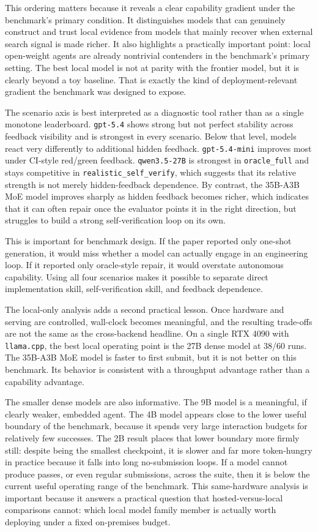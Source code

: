 \documentclass[a4paper,fleqn]{cas-dc}
\DeclareRobustCommand{\tool}[1]{\texttt{\nolinkurl{#1}}}
\begin{document}
This ordering matters because it reveals a clear capability gradient under the benchmark's primary condition. It distinguishes models that can genuinely construct and trust local evidence from models that mainly recover when external search signal is made richer. It also highlights a practically important point: local open-weight agents are already nontrivial contenders in the benchmark's primary setting. The best local model is not at parity with the frontier model, but it is clearly beyond a toy baseline. That is exactly the kind of deployment-relevant gradient the benchmark was designed to expose.

The scenario axis is best interpreted as a diagnostic tool rather than as a single monotone leaderboard. \tool{gpt-5.4} shows strong but not perfect stability across feedback visibility and is strongest in every scenario. Below that level, models react very differently to additional hidden feedback. \tool{gpt-5.4-mini} improves most under CI-style red/green feedback. \tool{qwen3.5-27B} is strongest in \tool{oracle_full} and stays competitive in \tool{realistic_self_verify}, which suggests that its relative strength is not merely hidden-feedback dependence. By contrast, the 35B-A3B MoE model improves sharply as hidden feedback becomes richer, which indicates that it can often repair once the evaluator points it in the right direction, but struggles to build a strong self-verification loop on its own.

This is important for benchmark design. If the paper reported only one-shot generation, it would miss whether a model can actually engage in an engineering loop. If it reported only oracle-style repair, it would overstate autonomous capability. Using all four scenarios makes it possible to separate direct implementation skill, self-verification skill, and feedback dependence.

The local-only analysis adds a second practical lesson. Once hardware and serving are controlled, wall-clock becomes meaningful, and the resulting trade-offs are not the same as the cross-backend headline. On a single RTX 4090 with \tool{llama.cpp}, the best local operating point is the 27B dense model at 38/60 runs. The 35B-A3B MoE model is faster to first submit, but it is not better on this benchmark. Its behavior is consistent with a throughput advantage rather than a capability advantage.

The smaller dense models are also informative. The 9B model is a meaningful, if clearly weaker, embedded agent. The 4B model appears close to the lower useful boundary of the benchmark, because it spends very large interaction budgets for relatively few successes. The 2B result places that lower boundary more firmly still: despite being the smallest checkpoint, it is slower and far more token-hungry in practice because it falls into long no-submission loops. If a model cannot produce passes, or even regular submissions, across the suite, then it is below the current useful operating range of the benchmark. This same-hardware analysis is important because it answers a practical question that hosted-versus-local comparisons cannot: which local model family member is actually worth deploying under a fixed on-premises budget.
\end{document}
